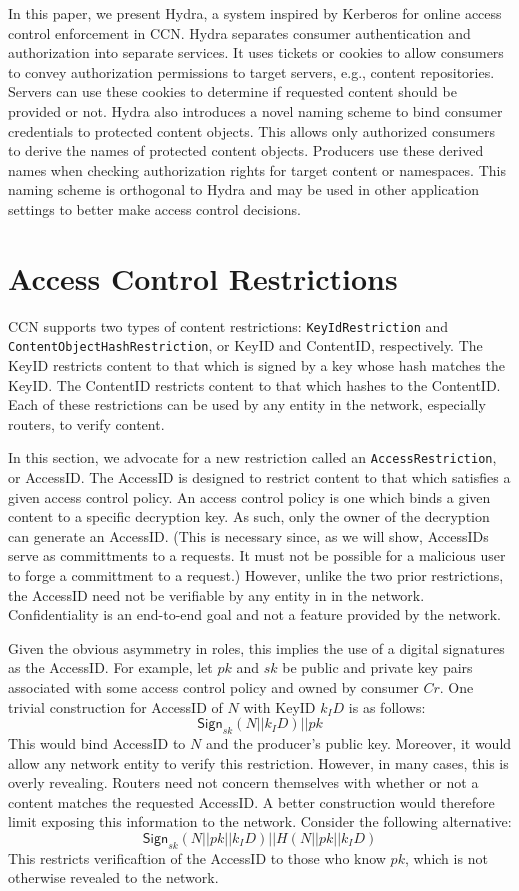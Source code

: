 \documentclass[conference]{IEEEtran}
\begin{document}
In this paper, we present Hydra, a system inspired by Kerberos for online access control
enforcement in CCN. Hydra separates consumer authentication and authorization into
separate services. It uses tickets or cookies to allow consumers to convey authorization
permissions to target servers, e.g., content repositories. Servers can use these cookies
to determine if requested content should be provided or not. Hydra also introduces a
novel naming scheme to bind consumer credentials to protected content objects. This
allows only authorized consumers to derive the names of protected content objects.
Producers use these derived names when checking authorization rights for target content
or namespaces. This naming scheme is orthogonal to Hydra and may be used in other
application settings to better make access control decisions.

\section{Access Control Restrictions}

CCN supports two types of content restrictions: {\tt KeyIdRestriction}
and {\tt ContentObjectHashRestriction}, or KeyID and ContentID, respectively.
The KeyID restricts content to that which is signed by a key whose hash matches
the KeyID. The ContentID restricts content to that which hashes to the ContentID.
Each of these restrictions can be used by any entity in the network, especially
routers, to verify content.

In this section, we advocate for a new restriction called an {\tt AccessRestriction},
or AccessID. The AccessID is designed to restrict content to that which satisfies
a given access control policy. An access control policy is one which binds a given
content to a specific decryption key. As such, only the owner of the decryption
can generate an AccessID. (This is necessary since, as we will show, AccessIDs serve
as committments to a requests. It must not be possible for a malicious user to forge
a committment to a request.) However, unlike the two prior restrictions, the AccessID
need not be verifiable by any entity in in the network. Confidentiality is an
end-to-end goal and not a feature provided by the network.

Given the obvious asymmetry in roles, this implies the use of a digital signatures
as the AccessID. For example, let $pk$ and $sk$ be public and private key pairs associated with
some access control policy and owned by consumer $Cr$. One trivial construction for AccessID
of $N$ with KeyID $k_ID$ is as follows:
$$
\mathsf{Sign}_{sk}(N || k_ID) || pk
$$
This would bind AccessID to $N$ and the producer's public key. Moreover, it would
allow any network entity to verify this restriction. However, in many cases, this
is overly revealing. Routers need not concern themselves with whether or not a
content matches the requested AccessID. A better construction would therefore limit
exposing this information to the network. Consider the following alternative:
$$
\mathsf{Sign}_{sk}(N || pk || k_ID) || H(N || pk || k_ID)
$$
This restricts verificaftion of the AccessID to those who know $pk$, which is not
otherwise revealed to the network.
\end{document}
